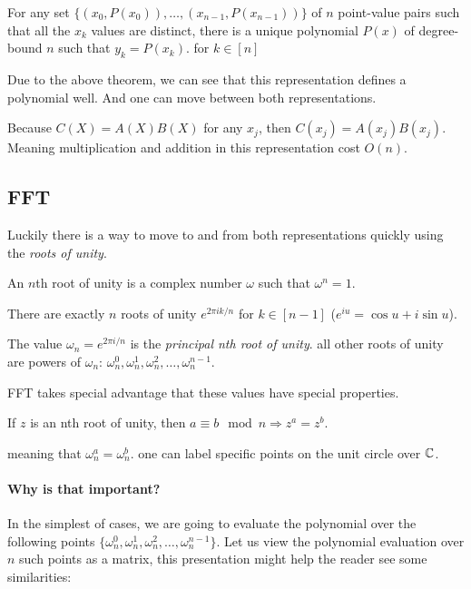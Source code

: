 \begin{theorem}
  For any set $ \{ (x_0,P(x_0)),\dots , (x_{n-1}, P(x_{n-1})) \}$ of $n$
  point-value pairs such that all the $x_k$ values are distinct,
  there is a unique polynomial $P(x)$ of degree-bound $n$ such that
  $y_k = P(x_k)$. for $k\in[n]$ 
\end{theorem}

Due to the above theorem, we can see that this representation defines a polynomial well. 
And one can move between both representations.

Because $C(X)=A(X)B(X)$ for any $x_j$, then $C(x_j)=A(x_j)B(x_j)$. Meaning 
multiplication and addition in this representation cost $O(n)$.
 
\subsection{FFT}
Luckily there is a way to move to and from both representations quickly using the \emph{roots of unity}.

\begin{defn}
An $n$th root of unity is a complex number $\omega$ such that
$\omega^n =1$.
\end{defn}

There are exactly $n$ roots of unity $e^{2\pi i k/n}$ for $k\in[n-1]$ 
($e^{iu}= \cos{u}+i \sin{u}$).

The value $\omega_n=e^{2\pi i/n}$ is the \emph{principal nth root of unity}.
all other roots of unity are powers of $\omega_n$:
 $\omega_n^0, \omega_n^1, \omega_n^2,\dots, \omega_n^{n-1}$.

FFT takes special advantage that these values have special properties.
\begin{lemma}\label{roots-of-unity-property}
If $z$ is an nth root of unity, then $ a \equiv b \mod n \Rightarrow z^a = z^b$.
\end{lemma}
meaning that $\omega_n^a = \omega_n^b$. one can label specific points on the unit circle over $\mathbb{C}$.

\paragraph{Why is that important?}

In the simplest of cases, we are going to evaluate the polynomial over the following
points $ \{\omega_n^0, \omega_n^1, \omega_n^2,\dots, \omega_n^{n-1}\}$.
Let us view the polynomial evaluation over $n$ such points as a matrix, this presentation
might help the reader see some similarities:



